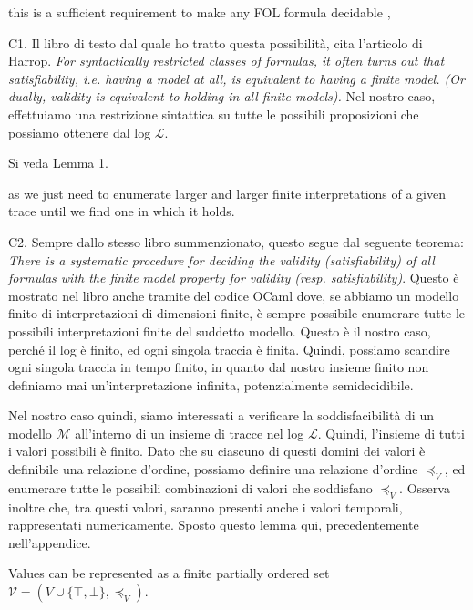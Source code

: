 this is a sufficient requirement to make any FOL formula decidable \cite{harrop},
\begin{UnknownEnvironment}
	\color{red} C1. Il libro di testo dal quale ho tratto questa possibilità, cita l'articolo di Harrop. \textit{For syntactically restricted classes of formulas, it often turns out that satisfiability, i.e. having a model at all, is equivalent to having a finite model. (Or dually, validity is equivalent to holding in all finite models).}  Nel nostro caso, effettuiamo una restrizione sintattica su tutte le possibili proposizioni che possiamo ottenere dal log $\mathcal{L}$. 
	
	Si veda Lemma 1.
\end{UnknownEnvironment} as we just need to enumerate larger and larger finite interpretations of a given trace until we find one in which it holds.
\begin{UnknownEnvironment}
	\color{red} C2. Sempre dallo stesso libro summenzionato, questo segue dal seguente teorema: \textit{There is a systematic procedure for deciding the validity (satisfiability) of all formulas with the finite model property for validity (resp. satisfiability)}. Questo è mostrato nel libro anche tramite del codice OCaml dove, se abbiamo un modello finito di interpretazioni di dimensioni finite, è sempre possibile enumerare tutte le possibili interpretazioni finite del suddetto modello. Questo è il nostro caso, perché il log è finito, ed ogni singola traccia è finita. Quindi, possiamo scandire ogni singola traccia in tempo finito, in quanto dal nostro insieme finito non definiamo mai un'interpretazione infinita, potenzialmente semidecidibile.
\end{UnknownEnvironment}
\begin{UnknownEnvironment}
{\color{blue} Nel nostro caso quindi, siamo interessati a verificare la soddisfacibilità di un modello $\mathcal{M}$ all'interno di un insieme di tracce nel log $\mathcal{L}$. Quindi, l'insieme di tutti i valori possibili è finito. Dato che su ciascuno di questi domini dei valori è definibile una relazione d'ordine, possiamo definire una relazione d'ordine $\preceq_V$, ed enumerare tutte le possibili combinazioni di valori che soddisfano $\preceq_V$. Osserva inoltre che, tra questi valori, saranno presenti anche i valori temporali, rappresentati numericamente. Sposto questo lemma qui, precedentemente nell'appendice.}
\end{UnknownEnvironment}
\begin{lemma}\label{lem:hu}
	Values can be represented as a finite partially ordered set $\mathcal{V}=(V\cup\{\top,\bot\},\preceq_V)$.
\end{lemma}

